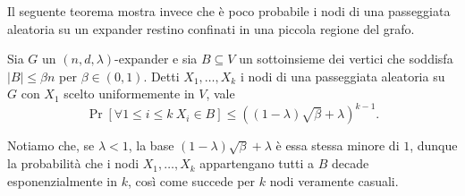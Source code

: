 Il seguente teorema mostra invece che è poco probabile i nodi di una
passeggiata aleatoria su un expander restino confinati in una piccola regione
del grafo.

\begin{theorem} \label{thm:expander-walk}
	Sia $G$ un $(n, d, \lambda)$-expander e sia $B \subseteq V$ un sottoinsieme
	dei vertici che soddisfa $|B| \le \beta n$ per $\beta \in (0, 1)$.
	Detti $X_1, \dots, X_k$ i nodi di una passeggiata aleatoria su $G$ con $X_1$
	scelto uniformemente in $V$, vale
	\[
		\Pr[\forall 1 \le i \le k \ X_i \in B]
		\le ((1 - \lambda)\sqrt{\beta} + \lambda)^{k - 1}.
	\]
\end{theorem}

Notiamo che, se $\lambda < 1$, la base $(1 - \lambda) \sqrt{\beta} + \lambda$ è
essa stessa minore di $1$, dunque la probabilità che i nodi $X_1, \dots, X_k$
appartengano tutti a $B$ decade esponenzialmente in $k$, così come succede
per $k$ nodi veramente casuali.

